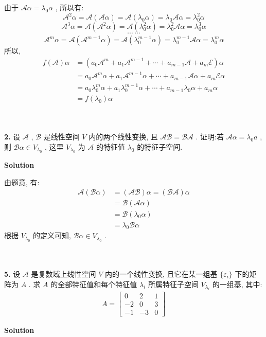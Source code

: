 \documentclass[11pt,a4paper,openany,oneside]{book}
\newcommand\Solution{\noindent\textbf{\textsf{Solution}}\par\medskip}
\begin{document}
由于 $ \mathcal{A}\alpha = \lambda_0 \alpha $ , 所以有:
 $$  \mathcal{A}^2\alpha = \mathcal{A}(\mathcal{A}\alpha) = \mathcal{A}(\lambda_0\alpha) = \lambda_0\mathcal{A}\alpha = \lambda_0^2\alpha   $$ 
 $$  \mathcal{A}^3\alpha = \mathcal{A}(\mathcal{A}^2\alpha) = \mathcal{A}(\lambda_0^2\alpha) = \lambda_0^2\mathcal{A}\alpha = \lambda_0^3\alpha   $$ 
 $$  \cdots \ \cdots  $$ 
 $$  \mathcal{A}^m\alpha = \mathcal{A}(\mathcal{A}^{m-1}\alpha) = \mathcal{A}(\lambda_0^{m-1}\alpha) = \lambda_0^{m-1}\mathcal{A}\alpha = \lambda_0^m\alpha   $$ 
所以,
\begin{align*}
f(\mathcal{A})\alpha &= \left(a_0\mathcal{A}^m + a_1\mathcal{A}^{m-1} + \cdots + a_{m-1}\mathcal{A} + a_m\mathcal{E} \right)\alpha  \\
&=a_0\mathcal{A}^m\alpha + a_1\mathcal{A}^{m-1}\alpha + \cdots + a_{m-1}\mathcal{A}\alpha + a_m\mathcal{E}\alpha  \\
&=a_0\lambda_0^m\alpha + a_1\lambda_0^{m-1}\alpha + \cdots + a_{m-1}\lambda_0\alpha + a_m\alpha  \\
&=f(\lambda_0)\alpha
\end{align*}  \\  \\ 

\begin{myexample}
	\textbf{2.} 设 $ \mathcal{A} $ , $ \mathcal{B} $ 是线性空间 $ V $ 内的两个线性变换, 且 $ \mathcal{AB} = \mathcal{BA} $ . 证明:若 $ \mathcal{A}\alpha = \lambda_0a $ , 则 $ \mathcal{B}\alpha \in V_{\lambda_0} $ , 这里 $ V_{\lambda_0} $ 为 $ \mathcal{A} $ 的特征值 $ \lambda_0 $ 的特征子空间. 
\end{myexample}
\Solution 

由题意, 有:
\begin{align*}
\mathcal{A}(\mathcal{B}\alpha) &= (\mathcal{AB})\alpha = (\mathcal{BA})\alpha  \\
&= \mathcal{B}(\mathcal{A}\alpha)  \\
&= \mathcal{B}(\lambda_0\alpha)  \\
&= \lambda_0\mathcal{B}\alpha
\end{align*}
根据 $ V_{\lambda_0} $ 的定义可知,  $ \mathcal{B}\alpha \in V_{\lambda_0} $ . \\  \\  \\




\begin{myexample}
	\textbf{5.} 设 $ \mathcal{A} $ 是复数域上线性空间 $ V $ 内的一个线性变换, 且它在某一组基 $ \{\varepsilon_i \} $ 下的矩阵为 $ A $ . 求 $ A $ 的全部特征值和每个特征值 $ \lambda_i $ 所属特征子空间 $ V_{\lambda_i} $ 的一组基, 其中:
\begin{gather*}
A=
\begin{bmatrix}
0  &  2  &  1 \\
-2  &  0  &  3  \\
-1  &  -3  &  0
\end{bmatrix}
\end{gather*}
\end{myexample}
\Solution
\end{document}
